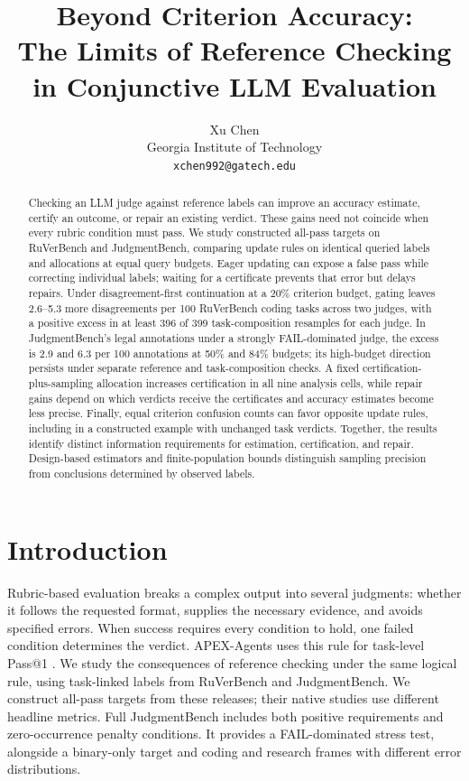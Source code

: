 \documentclass[10pt,letterpaper]{article}
\title{Beyond Criterion Accuracy:\\The Limits of Reference Checking\\in Conjunctive LLM Evaluation}
\author{Xu Chen\\\small Georgia Institute of Technology\\\small\texttt{xchen992@gatech.edu}}
\date{}
\begin{document}
\maketitle
\begin{abstract}
Checking an LLM judge against reference labels can improve an accuracy estimate, certify an outcome, or repair an existing verdict. These gains need not coincide when every rubric condition must pass. We study constructed all-pass targets on RuVerBench and JudgmentBench, comparing update rules on identical queried labels and allocations at equal query budgets. Eager updating can expose a false pass while correcting individual labels; waiting for a certificate prevents that error but delays repairs. Under disagreement-first continuation at a 20\% criterion budget, gating leaves 2.6--5.3 more disagreements per 100 RuVerBench coding tasks across two judges, with a positive excess in at least 396 of 399 task-composition resamples for each judge. In JudgmentBench's legal annotations under a strongly FAIL-dominated judge, the excess is 2.9 and 6.3 per 100 annotations at 50\% and 84\% budgets; its high-budget direction persists under separate reference and task-composition checks. A fixed certification-plus-sampling allocation increases certification in all nine analysis cells, while repair gains depend on which verdicts receive the certificates and accuracy estimates become less precise. Finally, equal criterion confusion counts can favor opposite update rules, including in a constructed example with unchanged task verdicts. Together, the results identify distinct information requirements for estimation, certification, and repair. Design-based estimators and finite-population bounds distinguish sampling precision from conclusions determined by observed labels.
\end{abstract}

\section{Introduction}
Rubric-based evaluation breaks a complex output into several judgments: whether it follows the requested format, supplies the necessary evidence, and avoids specified errors. When success requires every condition to hold, one failed condition determines the verdict. APEX-Agents uses this rule for task-level Pass@1 \citep{vidgen2026apex}. We study the consequences of reference checking under the same logical rule, using task-linked labels from RuVerBench and JudgmentBench. We construct all-pass targets from these releases; their native studies use different headline metrics. Full JudgmentBench includes both positive requirements and zero-occurrence penalty conditions. It provides a FAIL-dominated stress test, alongside a binary-only target and coding and research frames with different error distributions.
\end{document}
